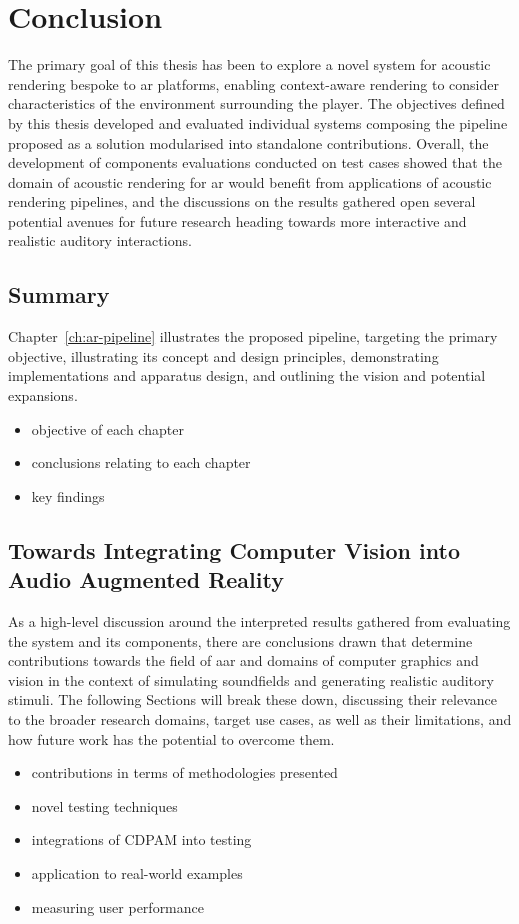 \chapter{Conclusion}\label{ch:Conclusion}

The primary goal of this thesis has been to explore a novel system for acoustic rendering bespoke to \acrshort{ar} platforms, enabling context-aware rendering to consider characteristics of the environment surrounding the player. The objectives defined by this thesis developed and evaluated individual systems composing the pipeline proposed as a solution modularised into standalone contributions. Overall, the development of components evaluations conducted on test cases showed that the domain of acoustic rendering for \acrshort{ar} would benefit from applications of acoustic rendering pipelines, and the discussions on the results gathered open several potential avenues for future research heading towards more interactive and realistic auditory interactions.

\section{Summary}
Chapter~\ref{ch:ar-pipeline} illustrates the proposed pipeline, targeting the primary objective, illustrating its concept and design principles, demonstrating implementations and apparatus design, and outlining the vision and potential expansions. 


\begin{itemize}
    \item objective of each chapter
    \item conclusions relating to each chapter
    \item key findings
\end{itemize}

\section{Towards Integrating Computer Vision into Audio Augmented Reality}
As a high-level discussion around the interpreted results gathered from evaluating the system and its components, there are conclusions drawn that determine contributions towards the field of \acrfull{aar} and domains of computer graphics and vision in the context of simulating soundfields and generating realistic auditory stimuli. The following Sections will break these down, discussing their relevance to the broader research domains, target use cases, as well as their limitations, and how future work has the potential to overcome them.
\begin{itemize}
    \item contributions in terms of methodologies presented
    \item novel testing techniques
    \item integrations of CDPAM into testing
    \item application to real-world examples 
    \item measuring user performance
\end{itemize}



